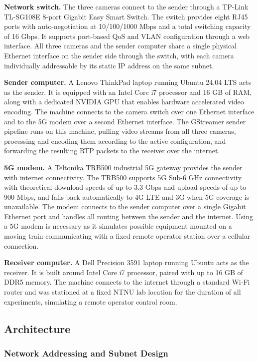 \textbf{Network switch.} The three cameras connect to the sender through a TP-Link TL-SG108E 8-port Gigabit Easy Smart Switch. The switch provides eight RJ45 ports with auto-negotiation at 10/100/1000 Mbps and a total switching capacity of 16 Gbps. It supports port-based QoS and VLAN configuration through a web interface. All three cameras and the sender computer share a single physical Ethernet interface on the sender side through the switch, with each camera individually addressable by its static IP address on the same subnet.

\textbf{Sender computer.} A Lenovo ThinkPad laptop running Ubuntu 24.04 LTS acts as the sender. It is equipped with an Intel Core i7 processor and 16 GB of RAM, along with a dedicated NVIDIA GPU that enables hardware accelerated video encoding. The machine connects to the camera switch over one Ethernet interface and to the 5G modem over a second Ethernet interface. The GStreamer sender pipeline runs on this machine, pulling video streams from all three cameras, processing and encoding them according to the active configuration, and forwarding the resulting RTP packets to the receiver over the internet.

\textbf{5G modem.} A Teltonika TRB500 industrial 5G gateway provides the sender with internet connectivity. The TRB500 supports 5G Sub-6 GHz connectivity with theoretical download speeds of up to 3.3 Gbps and upload speeds of up to 900 Mbps, and falls back automatically to 4G LTE and 3G when 5G coverage is unavailable. The modem connects to the sender computer over a single Gigabit Ethernet port and handles all routing between the sender and the internet. Using a 5G modem is necessary as it simulates possible equipment mounted on a moving train communicating with a fixed remote operator station over a cellular connection.

\textbf{Receiver computer.} A Dell Precision 3591 laptop running Ubuntu acts as the receiver. It is built around Intel Core i7 processor, paired with up to 16 GB of DDR5 memory. The machine connects to the internet through a standard Wi-Fi router and was stationed at a fixed NTNU lab location for the duration of all experiments, simulating a remote operator control room.

\subsection{Architecture}

\subsubsection{Network Addressing and Subnet Design}

